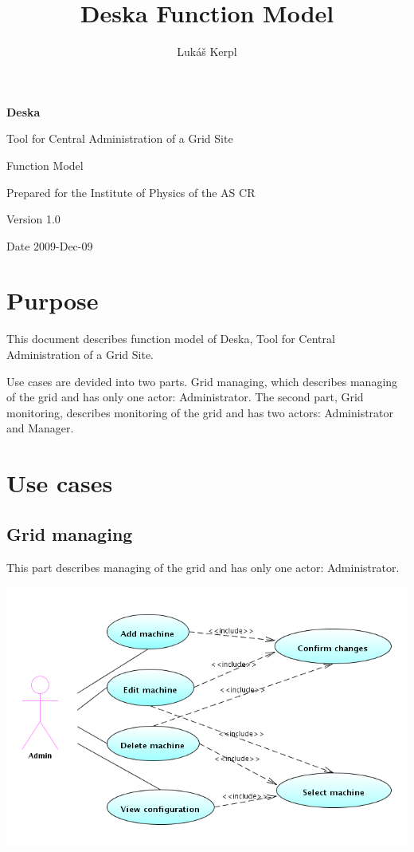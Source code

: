 \documentclass[12pt]{article}
\author{Lukáš Kerpl}
\title{Deska Function Model}
\begin{document}
{\Huge \textbf{Deska}}

\vspace{0.2in}

{\large Tool for Central Administration of a Grid Site}

\vspace{0.5in}

{\large Function Model}

\vspace{0.2in}

{\large Prepared for the Institute of Physics of the AS CR}

\vspace{0.2in}

{\large Version 1.0}

\vspace{0.2in}

{\large Date 2009-Dec-09}

\vspace{0.5in}



\section{Purpose}
This document describes function model of Deska, Tool for Central Administration
of a Grid Site.

Use cases are devided into two parts. Grid managing, which
describes managing of the grid and has only one actor: Administrator.
The second part, Grid monitoring, describes monitoring of the grid and has
two actors: Administrator and Manager.

\section{Use cases}

\subsection{Grid managing}
This part describes managing of the grid and has only one actor: Administrator.

\includegraphics[width=\linewidth]{grid_managing.png}
\end{document}
